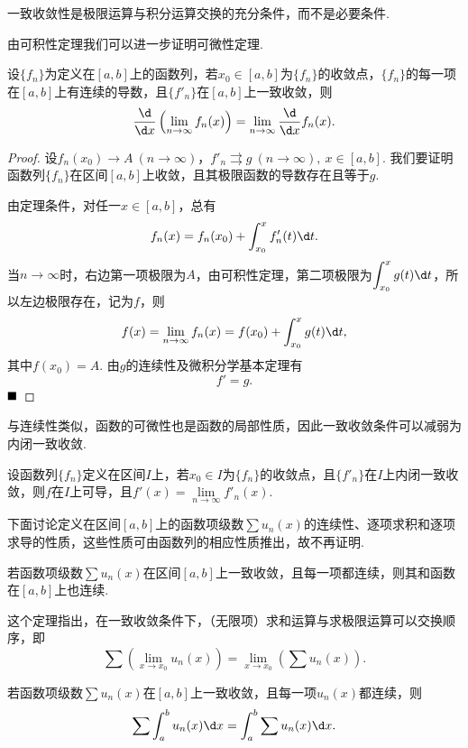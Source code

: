 \begin{remark}
	一致收敛性是极限运算与积分运算交换的充分条件，而不是必要条件.
\end{remark}
由可积性定理我们可以进一步证明可微性定理.
\begin{theorem}[可微性]
	设$\{f_n\}$为定义在$\left[a,b\right]$上的函数列，若$x_0\in\left[a,b\right]$为$\{f_n\}$的收敛点，$\{f_n\}$的每一项在$\left[a,b\right]$上有连续的导数，且$\{f'_n\}$在$\left[a,b\right]$上一致收敛，则
	$$\frac{\d}{\d x}\left(\lim\limits_{n\to\infty}f_n(x)\right)=\lim\limits_{n\to\infty}\frac{\d}{\d x}f_n(x).$$
\end{theorem}
\begin{proof}
	设$f_n(x_0)\to A\ (n\to\infty)$，$f'_n\rightrightarrows g\ (n\to\infty),\ x\in\left[a,b\right]$. 我们要证明函数列$\{f_n\}$在区间$\left[a,b\right]$上收敛，且其极限函数的导数存在且等于$g$.
	
	由定理条件，对任一$x\in\left[a,b\right]$，总有
	$$f_n(x)=f_n(x_0)+\int_{x_0}^{x}f'_n(t)\d t.$$
	当$n\to\infty$时，右边第一项极限为$A$，由可积性定理，第二项极限为$\displaystyle\int_{x_0}^{x}g(t)\d t$，所以左边极限存在，记为$f$，则
	$$f(x)=\lim\limits_{n\to\infty}f_n(x)=f(x_0)+\int_{x_0}^{x}g(t)\d t,$$
	其中$f(x_0)=A$. 由$g$的连续性及微积分学基本定理有
	$$f'=g.$$
	$\hfill\blacksquare$
\end{proof}
与连续性类似，函数的可微性也是函数的局部性质，因此一致收敛条件可以减弱为内闭一致收敛.
\begin{corollary}
	设函数列$\{f_n\}$定义在区间$I$上，若$x_0\in I$为$\{f_n\}$的收敛点，且$\{f'_n\}$在$I$上内闭一致收敛，则$f$在$I$上可导，且$f'(x)=\lim\limits_{n\to\infty}f'_n(x)$.
\end{corollary}
下面讨论定义在区间$\left[a,b\right]$上的函数项级数$\sum u_n(x)$的连续性、逐项求积和逐项求导的性质，这些性质可由函数列的相应性质推出，故不再证明.
\begin{theorem}[连续性]
	若函数项级数$\sum u_n(x)$在区间$\left[a,b\right]$上一致收敛，且每一项都连续，则其和函数在$\left[a,b\right]$上也连续.
\end{theorem}
\begin{remark}
	这个定理指出，在一致收敛条件下，（无限项）求和运算与求极限运算可以交换顺序，即
	$$\sum\left(\lim\limits_{x\to x_0}u_n(x)\right)=\lim\limits_{x\to x_0}\left(\sum u_n(x)\right).$$
\end{remark}
\begin{theorem}[逐项求积]
	若函数项级数$\sum u_n(x)$在$\left[a,b\right]$上一致收敛，且每一项$u_n(x)$都连续，则
	$$\sum\int_{a}^{b}u_n(x)\d x=\int_{a}^{b}\sum u_n(x)\d x.$$
\end{theorem}
